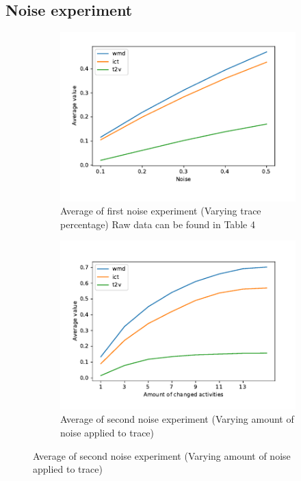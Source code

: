 \documentclass[runningheads]{template/llncs}
\begin{document}
\subsection{Noise experiment}
\begin{figure}
	\centering
	\begin{subfigure}[b]{0.49\textwidth}
		\centering
		\includegraphics[width=\textwidth]{figures/noise-first}
		\caption{Average of first noise experiment (Varying trace percentage) Raw data can be found in \cite{PBWe20} Table 4}
		\label{fig:noise-first}
	\end{subfigure}
	\hfill
	\begin{subfigure}[b]{0.49\textwidth}
		\centering
		\includegraphics[width=\textwidth]{figures/noise-second}
		\caption{Average of second noise experiment (Varying amount of noise applied to trace)}
		\label{fig:noise-second}
	\end{subfigure}
\end{figure}
\end{document}
